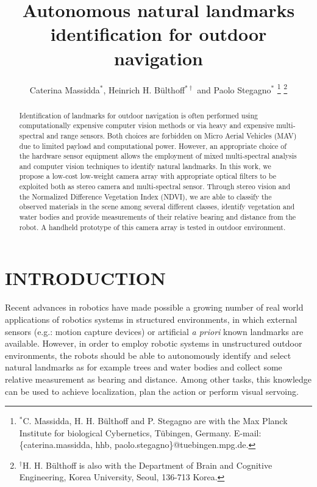 \documentclass[a4paper, 10pt, conference]{ieeeconf}      %
\title{\LARGE \bf
Autonomous natural landmarks identification for outdoor navigation
}
\author{
Caterina Massidda$^{*}$,
Heinrich H. B{\"u}lthoff$^{*\dag}$
and Paolo Stegagno$^{*}$%
\thanks{$^{*}$C. Massidda, H. H. B{\"u}lthoff and P. Stegagno are with the Max Planck Institute for biological Cybernetics, T{\"u}bingen, Germany. E-mail: \{caterina.massidda, hhb, paolo.stegagno\}@tuebingen.mpg.de.}%
\thanks{$^{\dag}$H. H. B{\"u}lthoff is also with the Department of Brain and Cognitive Engineering, Korea University, Seoul, 136-713 Korea.}%
}
\begin{document}
\maketitle
\thispagestyle{empty}
\pagestyle{empty}


\begin{abstract}
Identification of landmarks for outdoor navigation is often performed using computationally expensive computer vision methods or via heavy and expensive multi-spectral and range sensors. Both choices are forbidden on Micro Aerial Vehicles (MAV) due to limited payload and computational power. However, an appropriate choice of the hardware sensor equipment allows the employment of mixed multi-spectral analysis and computer vision techniques to identify natural landmarks. In this work, we propose a low-cost low-weight camera array with appropriate optical filters to be exploited both as stereo camera and multi-spectral sensor.
Through stereo vision and the Normalized Difference Vegetation Index (NDVI), we are able to classify the observed materials in the scene among several different classes, identify vegetation and water bodies and provide measurements of their relative bearing and distance from the robot.
A handheld prototype of this camera array is tested in outdoor environment.
\end{abstract}


\section{INTRODUCTION}\label{sec:introduction}

Recent advances in robotics have made possible a growing number of  real world applications of robotics systems in structured environments, in which external sensors (e.g.: motion capture devices) or artificial {\it a priori} known landmarks are available.
However, in order to employ robotic systems in unstructured outdoor environments, the robots should be able to autonomously identify and select natural landmarks as for example trees and water bodies and collect some relative measurement as bearing and distance.
Among other tasks, this knowledge can be used to achieve localization, plan the action or perform visual servoing.
\end{document}
